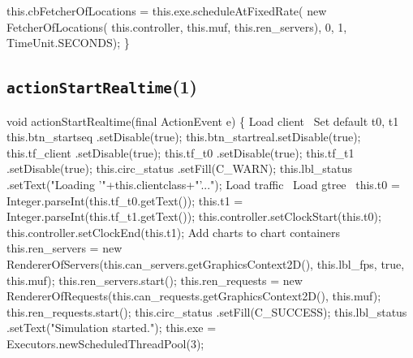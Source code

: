   this.cbFetcherOfLocations = this.exe.scheduleAtFixedRate(
      new FetcherOfLocations(
        this.controller, this.muf, this.ren_servers), 0, 1, TimeUnit.SECONDS);
\}
\eatline
{}\nwendcode{}\nwdocspar
\subsection{\texttt{actionStartRealtime}(1)}
\nwenddocs{}\endmoddef{}
void actionStartRealtime(final ActionEvent e) \{
  \LA{}Load client~{\nwtagstyle{}}\RA{}
  \LA{}Set default t0, t1~{\nwtagstyle{}}\RA{}
  this.btn_startseq .setDisable(true);
  this.btn_startreal.setDisable(true);
  this.tf_client     .setDisable(true);
  this.tf_t0        .setDisable(true);
  this.tf_t1        .setDisable(true);
  this.circ_status  .setFill(C_WARN);
  this.lbl_status   .setText("Loading '"+this.clientclass+"'...");
  \LA{}Load traffic~{\nwtagstyle{}}\RA{}
  \LA{}Load gtree~{\nwtagstyle{}}\RA{}
  this.t0 = Integer.parseInt(this.tf_t0.getText());
  this.t1 = Integer.parseInt(this.tf_t1.getText());
  this.controller.setClockStart(this.t0);
  this.controller.setClockEnd(this.t1);
  \LA{}Add charts to chart containers~{\nwtagstyle{}}\RA{}
  this.ren_servers = new RendererOfServers(this.can_servers.getGraphicsContext2D(), this.lbl_fps, true, this.muf);
  this.ren_servers.start();
  this.ren_requests = new RendererOfRequests(this.can_requests.getGraphicsContext2D(), this.muf);
  this.ren_requests.start();
  this.circ_status  .setFill(C_SUCCESS);
  this.lbl_status   .setText("Simulation started.");
  this.exe = Executors.newScheduledThreadPool(3);
